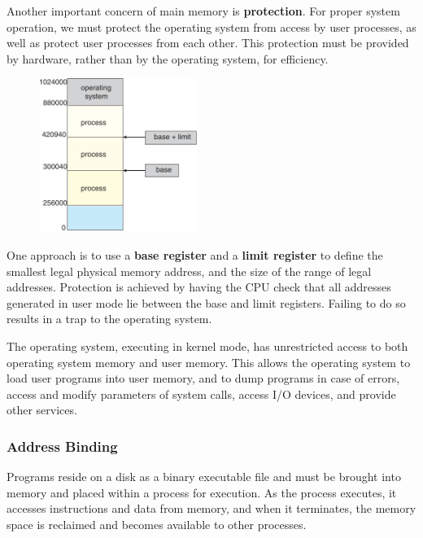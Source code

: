 \documentclass{article}
\begin{document}
Another important concern of main memory is \textbf{protection}. For
proper system operation, we must protect the operating system from
access by user processes, as well as protect user processes from each
other. This protection must be provided by hardware, rather than by the
operating system, for efficiency.
\begin{figure}[H]
    \centering
    \includegraphics[height = 5cm]{figures/memory_base_limit.pdf}
\end{figure}
One approach is to use a
\textbf{base register} and a \textbf{limit register} to define the
smallest legal physical memory address, and the size of the range of
legal addresses. Protection is achieved by having the CPU check that
all addresses generated in user mode lie between the base and limit
registers. Failing to do so results in a trap to the operating system.

The operating system, executing in kernel mode, has unrestricted access
to both operating system memory and user memory. This allows the
operating system to load user programs into user memory, and to dump
programs in case of errors, access and modify parameters of system
calls, access I/O devices, and provide other services.
\subsubsection{Address Binding}
Programs reside on a disk as a binary executable file and must be
brought into memory and placed within a process for execution. As the
process executes, it accesses instructions and data from memory, and
when it terminates, the memory space is reclaimed and becomes available
to other processes.
\end{document}
